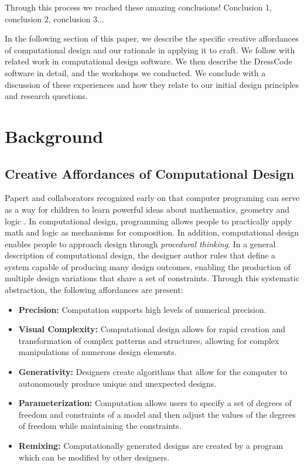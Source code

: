 \documentclass{sigchi}
\begin{document}
Through this process we reached these amazing conclusions! Conclusion 1, conclusion 2, conclusion 3...


In the following section of this paper, we describe the specific creative affordances of computational design and our rationale in applying it to craft. We follow with related work in computational design software. We then describe the DressCode software in detail, and the workshops we conducted. We conclude with a discussion of these experiences and how they relate to our initial design principles and research questions. 

\section{Background}

\subsection{Creative Affordances of Computational Design}
Papert and collaborators recognized early on that computer programing can serve as a way for children to learn powerful ideas about mathematics, geometry and logic \cite{papert}. In computational design, programming allows people to practically apply math and logic as mechanisms for composition. In addition, computational design enables people to approach design through \textit{procedural thinking}. In a general description of computational design, the designer author rules that define a system capable of producing many design outcomes, enabling the production of multiple design variations that share a set of constraints. Through this systematic abstraction, the following affordances are present\cite{reas}:
\begin{itemize}
\item \textbf{Precision:} Computation supports high levels of numerical precision.
\vspace{-8pt}
\item \textbf{Visual Complexity:} Computational design allows for rapid creation and transformation of complex patterns and structures, allowing for complex manipulations of numerous design elements.
\vspace{-6pt}
\item \textbf{Generativity:} Designers create algorithms that allow for the computer to autonomously produce unique and unexpected designs.
\vspace{-6pt}
\item \textbf{Parameterization:} Computation allows users to specify a set of degrees of freedom and constraints of a model and then adjust the values of the degrees of freedom while maintaining the constraints.
\vspace{-6pt}
\item \textbf{Remixing:} Computationally generated designs are created by a program which can be modified by other designers. 
\end{itemize} 
\end{document}
